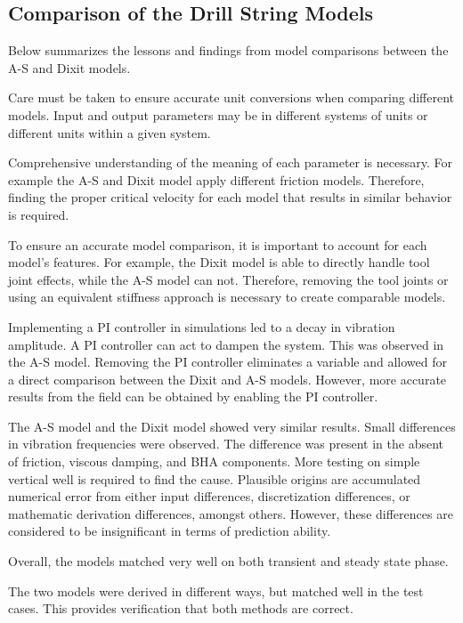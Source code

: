 \subsection{Comparison of the Drill String Models}
Below summarizes the lessons and findings from model comparisons between the A-S and Dixit models.
\begin{bulletedlist}
    \item Care must be taken to ensure accurate unit conversions when comparing different models. Input and output parameters may be in different systems of units or different units within a given system.
    \item Comprehensive understanding of the meaning of each parameter is necessary. For example the A-S and Dixit model apply different friction models. Therefore, finding the proper critical velocity for each model that results in similar behavior is required.
    \item To ensure an accurate model comparison, it is important to account for each model's features. For example, the Dixit model is able to directly handle tool joint effects, while the A-S model can not. Therefore, removing the tool joints or using an equivalent stiffness approach is necessary to create comparable models.
    \item Implementing a PI controller in simulations led to a decay in vibration amplitude. A PI controller can act to dampen the system. This was observed in the A-S model. Removing the PI controller eliminates a variable and allowed for a direct comparison between the Dixit and A-S models. However, more accurate results from the field can be obtained by enabling the PI controller.
    \item The A-S model and the Dixit model showed very similar results. Small differences in vibration frequencies were observed. The difference was present in the absent of friction, viscous damping, and BHA components. More testing on simple vertical well is required to find the cause.  Plausible origins are accumulated numerical error from either input differences, discretization differences, or mathematic derivation differences, amongst others.  However, these differences are considered to be insignificant in terms of prediction ability.
    \item Overall, the models matched very well on both transient and steady state phase.
    \item The two models were derived in different ways, but matched well in the test cases.  This provides verification that both methods are correct.
\end{bulletedlist}

